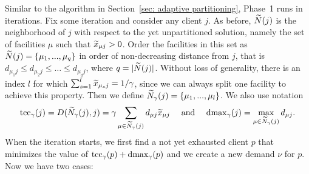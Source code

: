Similar to the algorithm in Section~\ref{sec: adaptive partitioning},
Phase~1 runs in iterations. Fix some iteration and consider any client $j$.  As before,
${\widetilde N}(j)$ is the neighborhood of $j$ with respect to the yet
unpartitioned solution, namely the set of facilities $\mu$ such that
${\widetilde x}_{\mu j}>0$. Order the facilities in this set as
${\widetilde N}(j) = { \left\{ \mu_1,...,\mu_q \right\} }$ in order of non-decreasing
distance from $j$, that is
$d_{\mu_1 j} \leq d_{\mu_2 j} \leq \ldots \leq d_{\mu_q j}$, where
$q = |{\widetilde N}(j)|$. Without loss of generality, there is an index
$l$ for which $\sum_{s=1}^l {\widetilde x}_{\mu_s j} = 1/\gamma$, since we can
always split one facility to achieve this property. Then we define
${\widetilde N}_{\gamma}(j) = { \left\{ \mu_1,...,\mu_l \right\} }$. We also use notation
%
\begin{equation*}
\textrm{tcc}_\gamma(j) =  D({\widetilde N}_\gamma(j), j) = \gamma\sum_{\mu\in{\widetilde N}_{\gamma}(j)} d_{\mu j} {\widetilde x}_{\mu j}
			\quad\textrm{ and }\quad
 \text{dmax}_\gamma(j) = \max_{\mu \in {\widetilde N}_{\gamma}(j)} d_{\mu j}. 
\end{equation*}
%
When the iteration starts, we first find a not yet exhausted client $p$ that minimizes the
value of $\textrm{tcc}_\gamma(p) + \text{dmax}_\gamma(p)$ and we create a new demand $\nu$ for $p$.
Now we have two cases:
%
